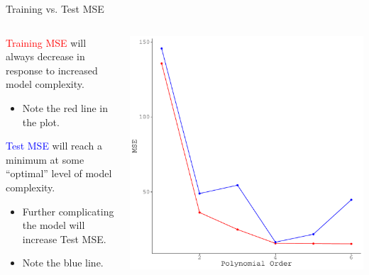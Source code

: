 \documentclass{beamer}\usepackage[]{graphicx}\usepackage[]{color}
\makeatletter
\def\maxwidth{ %
  \ifdim\Gin@nat@width>\linewidth
    \linewidth
  \else
    \Gin@nat@width
  \fi
}
\newenvironment{knitrout}{}{} %
\makeatother
\begin{document}
\begin{frame}{Training vs. Test MSE}
  
  \begin{columns}
    \begin{column}{0.5\textwidth}
      
      \textcolor{red}{Training MSE} will always decrease in response to 
      increased model complexity.  
      \vb
      \begin{itemize}
      \item Note the red line in the plot.
      \end{itemize}
      \vb
      \textcolor{blue}{Test MSE} will reach a minimum at some ``optimal'' level 
      of model complexity.
      \vb
      \begin{itemize}
      \item Further complicating the model will increase Test MSE.
        \vb
      \item Note the blue line.
      \end{itemize}
      
    \end{column}
    
    \begin{column}{0.5\textwidth}
      
\begin{knitrout}\footnotesize
{}\color{fgcolor}

{\centering \includegraphics[width=\maxwidth]{figure/mse_fig-1} 

}



\end{knitrout}

\end{column}
\end{columns}

\end{frame}
\end{document}
